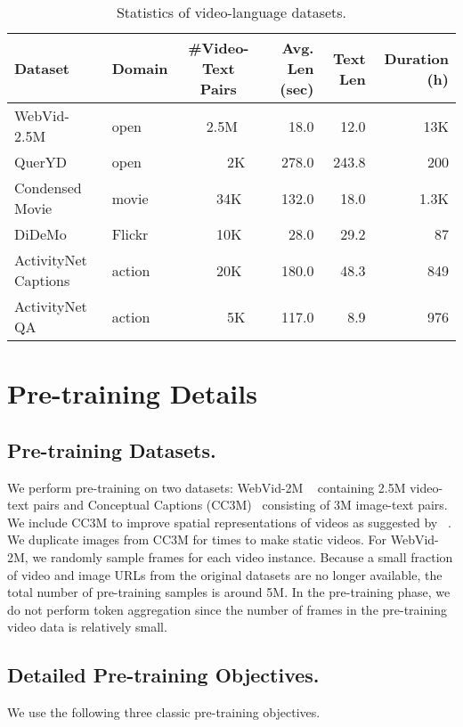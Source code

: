 \documentclass[11pt]{article}
\begin{document}
\begin{table*}[t]
\small
\centering
\begin{tabular}{l l c r r r} 
\toprule
Dataset & Domain  & \#Video-Text Pairs & Avg. Len (sec) & Text Len & Duration (h) \\
\midrule
WebVid-2.5M~\cite{Bain2021FrozenIT} & open & ~2.5M & 18.0 & 12.0 & 13K \\
QuerYD~\cite{Oncescu2020QUERYDAV} & open  & ~~~~~2K  & 278.0 & 243.8 & 200\\
Condensed Movie~\cite{Bain2020CondensedMS} & movie  & ~~~34K  & 132.0 & 18.0  & 1.3K \\
DiDeMo~\cite{Hendricks2017LocalizingMI} & Flickr & ~~~10K & 28.0 & 29.2 &87 \\ 
ActivityNet Captions~\cite{Krishna2017DenseCaptioningEI} & action & ~~~20K & 180.0 & 48.3 & 849 \\
ActivityNet QA~\cite{Yu2019ActivityNetQAAD} & action & ~~~~~5K & 117.0 & 8.9 & 976 \\
\bottomrule
\end{tabular}
\caption{Statistics of video-language datasets.}
\label{tab:datasets}
\end{table*} 
\section{Pre-training Details}
\label{sec:pre-training}

\subsection{Pre-training Datasets.}
\label{subsec:pre-training-datasets}
We perform pre-training on two datasets: WebVid-2M ~\citep{Bain2021FrozenIT} containing 2.5M video-text pairs and Conceptual Captions (CC3M)~\citep{Changpinyo2021Conceptual1P} consisting of 3M image-text pairs.
We include CC3M to improve spatial representations of videos as suggested by ~\citet{Li2021AlignAP}.
We duplicate images from CC3M for  times to make static videos. 
For WebVid-2M, we randomly sample  frames for each video instance.  
Because a small fraction of video and image URLs from the original datasets are no longer available, the total number of pre-training samples is around 5M. 
In the pre-training phase, we do not perform token aggregation since the number of frames in the pre-training video data is relatively small.


\subsection{Detailed Pre-training Objectives.}
\label{subsec:pre-training-obj}
We use the following three classic pre-training objectives.
\end{document}
